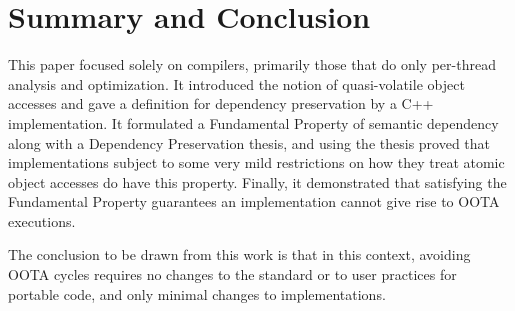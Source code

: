 \section{Summary and Conclusion}
\label{sec:Summary and Conclusion}

This paper focused solely on compilers, primarily those that do only
per-thread analysis and optimization.
It introduced the notion of quasi-volatile object accesses and gave
a definition for dependency preservation by a C++ implementation.
It formulated a Fundamental Property of semantic dependency along with
a Dependency Preservation thesis, and using the thesis proved
that implementations subject to some very mild restrictions on how
they treat atomic object accesses do have this property.
Finally, it demonstrated that satisfying the Fundamental Property
guarantees an implementation cannot give rise to OOTA executions.

The conclusion to be drawn from this work is that in this context,
avoiding OOTA cycles requires no changes to the standard
or to user practices for portable code, and only minimal changes to
implementations.






